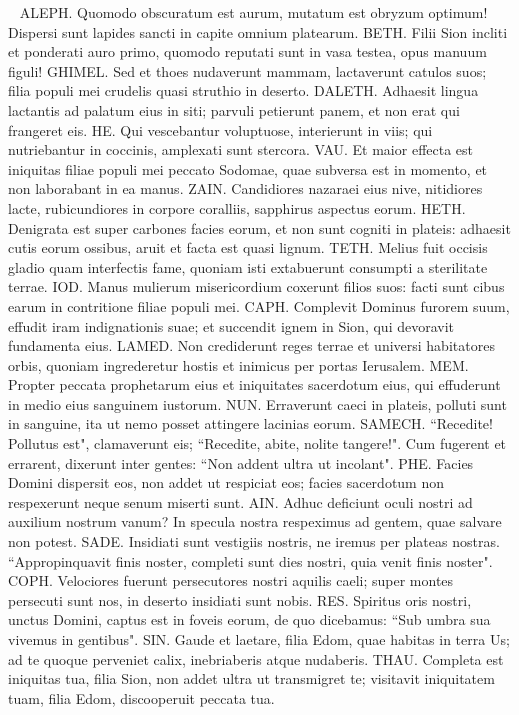 \begin{biblechapter}   
\verse ALEPH. Quomodo obscuratum est aurum, mutatum est obryzum optimum! Dispersi sunt lapides sancti in capite omnium platearum. 
\verse BETH. Filii Sion incliti et ponderati auro primo, quomodo reputati sunt in vasa testea, opus manuum figuli! 
\verse GHIMEL. Sed et thoes nudaverunt mammam, lactaverunt catulos suos; filia populi mei crudelis quasi struthio in deserto. 
\verse DALETH. Adhaesit lingua lactantis ad palatum eius in siti; parvuli petierunt panem, et non erat qui frangeret eis. 
\verse HE. Qui vescebantur voluptuose, interierunt in viis; qui nutriebantur in coccinis, amplexati sunt stercora. 
\verse VAU. Et maior effecta est iniquitas filiae populi mei peccato Sodomae, quae subversa est in momento, et non laborabant in ea manus. 
\verse ZAIN. Candidiores nazaraei eius nive, nitidiores lacte, rubicundiores in corpore coralliis, sapphirus aspectus eorum. 
\verse HETH. Denigrata est super carbones facies eorum, et non sunt cogniti in plateis: adhaesit cutis eorum ossibus, aruit et facta est quasi lignum. 
\verse TETH. Melius fuit occisis gladio quam interfectis fame, quoniam isti extabuerunt consumpti a sterilitate terrae. 
\verse IOD. Manus mulierum misericordium coxerunt filios suos: facti sunt cibus earum in contritione filiae populi mei. 
\verse CAPH. Complevit Dominus furorem suum, effudit iram indignationis suae; et succendit ignem in Sion, qui devoravit fundamenta eius. 
\verse LAMED. Non crediderunt reges terrae et universi habitatores orbis, quoniam ingrederetur hostis et inimicus per portas Ierusalem. 
\verse MEM. Propter peccata prophetarum eius et iniquitates sacerdotum eius, qui effuderunt in medio eius sanguinem iustorum. 
\verse NUN. Erraverunt caeci in plateis, polluti sunt in sanguine, ita ut nemo posset attingere lacinias eorum. 
\verse SAMECH. “Recedite! Pollutus est", clamaverunt eis; “Recedite, abite, nolite tangere!". Cum fugerent et errarent, dixerunt inter gentes: “Non addent ultra ut incolant". 
\verse PHE. Facies Domini dispersit eos, non addet ut respiciat eos; facies sacerdotum non respexerunt neque senum miserti sunt. 
\verse AIN. Adhuc deficiunt oculi nostri ad auxilium nostrum vanum? In specula nostra respeximus ad gentem, quae salvare non potest. 
\verse SADE. Insidiati sunt vestigiis nostris, ne iremus per plateas nostras. “Appropinquavit finis noster, completi sunt dies nostri, quia venit finis noster". 
\verse COPH. Velociores fuerunt persecutores nostri aquilis caeli; super montes persecuti sunt nos, in deserto insidiati sunt nobis. 
\verse RES. Spiritus oris nostri, unctus Domini, captus est in foveis eorum, de quo dicebamus: “Sub umbra sua vivemus in gentibus". 
\verse SIN. Gaude et laetare, filia Edom, quae habitas in terra Us; ad te quoque perveniet calix, inebriaberis atque nudaberis. 
\verse THAU. Completa est iniquitas tua, filia Sion, non addet ultra ut transmigret te; visitavit iniquitatem tuam, filia Edom, discooperuit peccata tua. 
\end{biblechapter}


